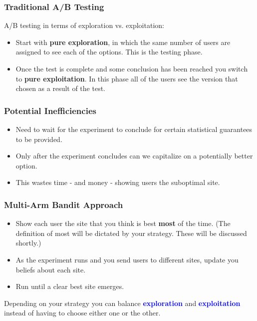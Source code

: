 \documentclass{beamer}
\begin{document}
\begin{frame}
  \frametitle{Traditional A/B Testing}
  A/B testing in terms of exploration vs. exploitation: \vspace{3mm}
  \begin{itemize} 
    \item Start with \textbf{pure exploration}, in which the same number of users are assigned to see each of the options. This is the testing phase. \pause
    \item Once the test is complete and some conclusion has been reached you switch to \textbf{pure exploitation}. In this phase all of the users see the version that chosen as a result of the test.
  \end{itemize}
\end{frame}

\begin{frame}
  \frametitle{Potential Inefficiencies}
  \begin{itemize}
    \item Need to wait for the experiment to conclude for certain statistical guarantees to be provided. \vspace{2mm} \pause
    \item Only after the experiment concludes can we capitalize on a potentially better option. \vspace{2mm} \pause
    \item This wastes time - and money - showing users the suboptimal site.
  \end{itemize}
\end{frame}

\begin{frame}
  \frametitle{Multi-Arm Bandit Approach}
  \begin{itemize}
    \item Show each user the site that you think is best \textbf{most} of the time. \pause (The definition of most will be dictated by your strategy. These will be discussed shortly.) \vspace{2mm} \pause
    \item As the experiment runs and you send users to different sites, update you beliefs about each site. \vspace{2mm} \pause
    \item Run until a clear best site emerges.
  \end{itemize} \vspace{3mm}

  Depending on your strategy you can balance \textbf{\textcolor{blue}{exploration}} and  \textbf{\textcolor{blue}{exploitation}} instead of having to choose either one or the other.
\end{frame}
\end{document}
